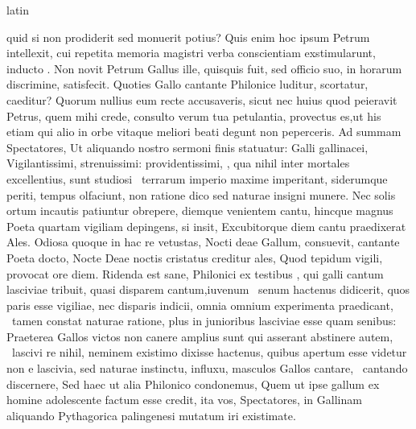 \documentclass[12pt]{book}
\renewenvironment{latin}
    	{\begin{hyphenrules}{latin}}
    	{\end{hyphenrules}}
\begin{document}
\begin{pages}
\begin{latin}
\begin{Leftside}
                  quid si non prodiderit sed monuerit potius? Quis enim hoc ipsum  Petrum intellexit,
                  cui repetita memoria magistri verba conscientiam exstimularunt, inducto . Non novit Petrum Gallus ille,
                  quisquis fuit, sed officio suo, in horarum discrimine, satisfecit. Quoties Gallo cantante Philonice luditur, scortatur, caeditur? Quorum nullius eum recte
                  accusaveris, sicut nec huius quod peieravit Petrus, quem mihi crede, consulto  verum tua  petulantia, 
                  provectus es,ut his etiam qui alio in orbe vitaque meliori beati degunt non peperceris. Ad summam Spectatores, Ut aliquando nostro sermoni finis statuatur: Galli gallinacei, Vigilantissimi, strenuissimi: 
                  providentissimi, , qua nihil inter mortales excellentius, sunt studiosi  \ampersand\ terrarum imperio maxime imperitant,
                  siderumque periti, tempus olfaciunt, non ratione dico sed naturae insigni munere. Nec solis ortum incautis patiuntur obrepere, diemque venientem  cantu,
                  hincque magnus Poeta quartam vigiliam depingens, si insit, Excubitorque diem cantu praedixerat Ales. Odiosa quoque in hac re vetustas, Nocti deae Gallum,  consuevit,
                  cantante Poeta  docto, Nocte Deae noctis cristatus creditur ales, Quod tepidum vigili, provocat ore diem. 
                  Ridenda est sane, Philonici ex testibus , qui galli cantum lasciviae tribuit, quasi disparem cantum,iuvenum  \ampersand\ senum hactenus didicerit, 
                  quos paris esse vigiliae, nec disparis indicii, omnia omnium experimenta praedicant,  \ampersand\ tamen constat naturae ratione, plus in junioribus lasciviae esse quam senibus: 
                  Praeterea Gallos victos non canere amplius sunt qui asserant abstinere autem,  \ampersand\ lascivi re nihil, neminem existimo dixisse hactenus, quibus apertum esse videtur non e lascivia,
                  sed naturae instinctu,  influxu, masculos Gallos cantare,  \ampersand\ cantando discernere,
                  Sed haec ut alia Philonico condonemus,  Quem ut ipse gallum ex homine adolescente factum esse credit, ita vos, Spectatores, in Gallinam aliquando Pythagorica palingenesi mutatum iri existimate. 

\end{Leftside}
\end{latin}
\end{pages}
\end{document}
